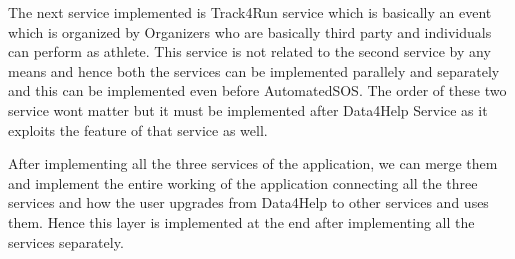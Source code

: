 The next service implemented is Track4Run service which is basically an event which is organized by Organizers who are basically third party and individuals can perform as athlete. This service is not related to the second service by any means and hence both the services can be implemented parallely and separately and this can be implemented even before AutomatedSOS. The order of these two service wont matter but it must be implemented after Data4Help Service as it exploits the feature of that service as well.\newline

After implementing all the three services of the application, we can merge them and implement the entire working of the application connecting all the three services and how the user upgrades from Data4Help to other services and uses them. Hence this layer is implemented at the end after implementing all the services separately.